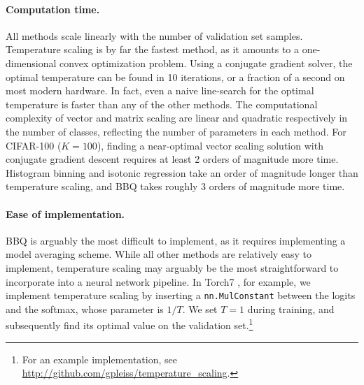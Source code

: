 \paragraph{Computation time.} All methods scale linearly with the number of validation set samples. Temperature scaling is by far the fastest method, as it amounts to a one-dimensional convex optimization problem. Using a conjugate gradient solver, the optimal temperature can be found in 10 iterations, or a fraction of a second on most modern hardware. In fact, even a naive line-search for the optimal temperature is faster than any of the other methods. The computational complexity of vector and matrix scaling are linear and quadratic respectively in the number of classes, reflecting the number of parameters in each method. For CIFAR-100 ($K=100$), finding a near-optimal vector scaling solution with conjugate gradient descent requires at least 2 orders of magnitude more time. Histogram binning and isotonic regression take an order of magnitude longer than temperature scaling, and BBQ takes roughly 3 orders of magnitude more time.

\paragraph{Ease of implementation.} BBQ is arguably the most difficult to implement, as it requires implementing a model averaging scheme.
While all other methods are relatively easy to implement, temperature scaling may arguably be the most straightforward to incorporate into a neural network pipeline.
In Torch7 \citep{collobert2011torch7}, for example, we implement temperature scaling by inserting a \texttt{nn.MulConstant} between the logits and the softmax, whose parameter is $1/T$.
We set $T\!=\!1$ during training, and subsequently find its optimal value on the validation set.\footnote{
  For an example implementation, see \url{http://github.com/gpleiss/temperature_scaling}.
}
